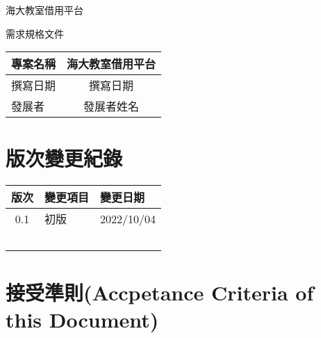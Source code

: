 \documentclass{article}
\begin{document}
\begin{titlepage}
	\centering

	{\huge 海大教室借用平台}

	\vfill

	{\huge 需求規格文件}

	\vfill

	\begin{Large}
		\begin{center}
			\begin{tabular}{| a | c |}
				\hline
				專案名稱 & 海大教室借用平台 \\ \hline
				撰寫日期 & 撰寫日期     \\ \hline
				發展者  & 發展者姓名    \\ \hline
			\end{tabular}
		\end{center}
	\end{Large}
\end{titlepage}


\section*{版次變更紀錄}

\begin{tabularx}{\textwidth}{| c | X | X |}
	\rowcolor{LightGray}
	\hline
	版次  & 變更項目 & 變更日期       \\ \hline
	0.1 & 初版   & 2022/10/04 \\ \hline
	    &      &            \\ \hline
	    &      &            \\ \hline
	    &      &            \\ \hline
	    &      &            \\ \hline
	    &      &            \\ \hline
\end{tabularx}

\newpage

\begin{center}
	\tableofcontents
\end{center}

\newpage

\section[接受準則(ACCEPTANCE CRITERIA OF THIS DOCUMENT)]{接受準則(Accpetance Criteria of this Document)}
\end{document}

